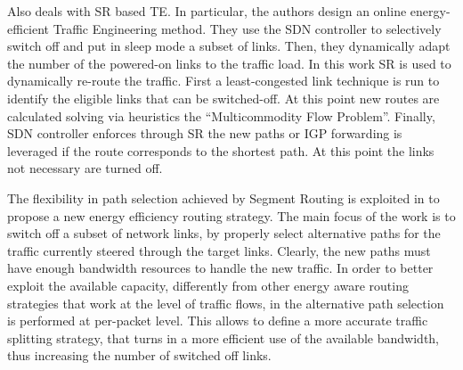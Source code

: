 Also \cite{energyefficient} deals with SR based TE. In particular, the authors design an online energy-efficient Traffic Engineering method. They use the SDN controller to selectively switch off and put in sleep mode a subset of links. Then, they dynamically adapt the number of the powered-on links to the traffic load.
In this work SR is used to dynamically re-route the traffic. First a least-congested link technique is run to identify the eligible links that can be switched-off. At this point new routes are calculated solving via heuristics the ``Multicommodity Flow Problem''. Finally, SDN controller enforces through SR the new paths or IGP forwarding is leveraged if the route corresponds to the shortest path. At this point the links not necessary are turned off. 

The flexibility in path selection achieved by Segment Routing is exploited in \cite{ghuman2017per} to propose a new energy efficiency routing strategy.
The main focus of the work is to switch off a subset of network links, by properly select alternative paths for the traffic currently steered through the target links.
Clearly, the new paths must have enough bandwidth resources to handle the new traffic.
In order to better exploit the available capacity, differently from other energy aware routing strategies that work at the level of traffic flows, in \cite{ghuman2017per} the alternative path selection is performed at per-packet level.
This allows to define a more accurate traffic splitting strategy, that turns in a more efficient use of the available bandwidth, thus increasing the number of switched off links.

